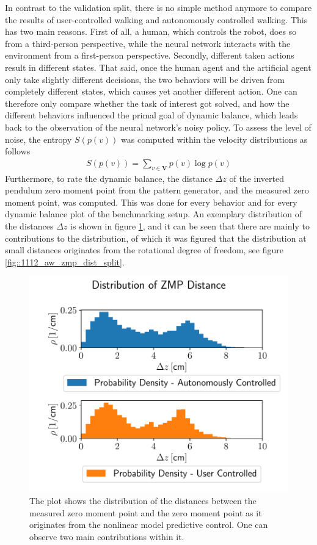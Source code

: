 In contrast to the validation split, there is no simple method anymore to compare the results of user-controlled walking and autonomously controlled walking. This has two main reasons. First of all, a human, which controls the robot, does so from a third-person perspective, while the neural network interacts with the environment from a first-person perspective. Secondly, different taken actions result in different states. That said, once the human agent and the artificial agent only take slightly different decisions, the two behaviors will be driven from completely different states, which causes yet another different action. One can therefore only compare whether the task of interest got solved, and how the different behaviors influenced the primal goal of dynamic balance, which leads back to the observation of the neural network's noisy policy. To assess the level of noise, the entropy $S(p(v))$ was computed within the velocity distributions as follows
\begin{align}
	S(p(v)) = \sum_{v\in \bm{V}}p(v)\log p(v)
\end{align}
Furthermore, to rate the dynamic balance, the distance $\Delta z$ of the inverted pendulum zero moment point from the pattern generator, and the measured zero moment point, was computed. This was done for every behavior and for every dynamic balance plot of the benchmarking setup. An exemplary distribution of the distances $\Delta z$ is shown in figure \ref{fig::1112_aw_zmp_dist}, and it can be seen that there are mainly to contributions to the distribution, of which it was figured that the distribution at small distances originates from the rotational degree of freedom, see figure \ref{fig::1112_aw_zmp_dist_split}.
\begin{figure}[h!] 
	\centering
	\includegraphics[scale=.45]{chapters/11_autonomous_walking_experiments/img/zmp_distribution_benchmark.pdf}
	\caption{The plot shows the distribution of the distances between the measured zero moment point and the zero moment point as it originates from the nonlinear model predictive control. One can observe two main contributions within it.}
	\label{fig::1112_aw_zmp_dist}
\end{figure} 
